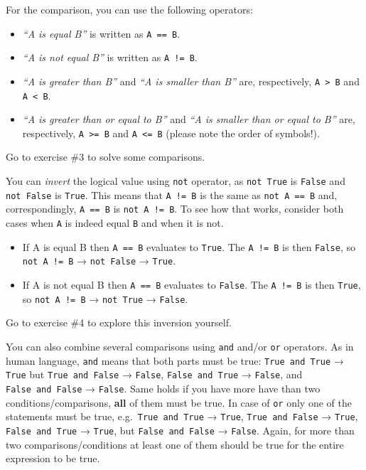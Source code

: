 \documentclass[
]{book}
\providecommand{\tightlist}{%
  \setlength{\itemsep}{0pt}\setlength{\parskip}{0pt}}
\begin{document}
For the comparison, you can use the following operators:

\begin{itemize}
\tightlist
\item
  \emph{``A is equal B''} is written as \texttt{A\ ==\ B}.
\item
  \emph{``A is not equal B''} is written as \texttt{A\ !=\ B}.
\item
  \emph{``A is greater than B''} and \emph{``A is smaller than B''} are, respectively, \texttt{A\ \textgreater{}\ B} and \texttt{A\ \textless{}\ B}.
\item
  \emph{``A is greater than or equal to B''} and \emph{``A is smaller than or equal to B''} are, respectively, \texttt{A\ \textgreater{}=\ B} and \texttt{A\ \textless{}=\ B} (please note the order of symbols!).
\end{itemize}

Go to exercise \#3 to solve some comparisons.

You can \emph{invert} the logical value using \texttt{not} operator, as \texttt{not\ True} is \texttt{False} and \texttt{not\ False} is \texttt{True}. This means that \texttt{A\ !=\ B} is the same as \texttt{not\ A\ ==\ B} and, correspondingly, \texttt{A\ ==\ B} is \texttt{not\ A\ !=\ B}. To see how that works, consider both cases when \texttt{A} is indeed equal \texttt{B} and when it is not.

\begin{itemize}
\tightlist
\item
  If A is equal B then \texttt{A\ ==\ B} evaluates to \texttt{True}. The \texttt{A\ !=\ B} is then \texttt{False}, so \texttt{not\ A\ !=\ B} → \texttt{not\ False} → \texttt{True}.
\item
  If A is not equal B then \texttt{A\ ==\ B} evaluates to \texttt{False}. The \texttt{A\ !=\ B} is then \texttt{True}, so \texttt{not\ A\ !=\ B} → \texttt{not\ True} → \texttt{False}.
\end{itemize}

Go to exercise \#4 to explore this inversion yourself.

You can also combine several comparisons using \texttt{and} and/or \texttt{or} operators. As in human language, \texttt{and} means that both parts must be true: \texttt{True\ and\ True} → \texttt{True} but \texttt{True\ and\ False} → \texttt{False}, \texttt{False\ and\ True} → \texttt{False}, and \texttt{False\ and\ False} → \texttt{False}. Same holds if you have more have than two conditions/comparisons, \textbf{all} of them must be true. In case of \texttt{or} only one of the statements must be true, e.g.~\texttt{True\ and\ True} → \texttt{True}, \texttt{True\ and\ False} → \texttt{True}, \texttt{False\ and\ True} → \texttt{True}, but \texttt{False\ and\ False} → \texttt{False}. Again, for more than two comparisons/conditions at least one of them should be true for the entire expression to be true.
\end{document}
